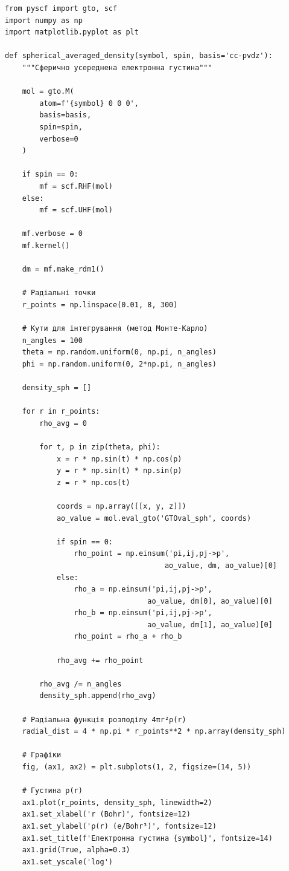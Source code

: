 \begin{verbatim}
from pyscf import gto, scf
import numpy as np
import matplotlib.pyplot as plt

def spherical_averaged_density(symbol, spin, basis='cc-pvdz'):
    """Сферично усереднена електронна густина"""

    mol = gto.M(
        atom=f'{symbol} 0 0 0',
        basis=basis,
        spin=spin,
        verbose=0
    )

    if spin == 0:
        mf = scf.RHF(mol)
    else:
        mf = scf.UHF(mol)

    mf.verbose = 0
    mf.kernel()

    dm = mf.make_rdm1()

    # Радіальні точки
    r_points = np.linspace(0.01, 8, 300)

    # Кути для інтегрування (метод Монте-Карло)
    n_angles = 100
    theta = np.random.uniform(0, np.pi, n_angles)
    phi = np.random.uniform(0, 2*np.pi, n_angles)

    density_sph = []

    for r in r_points:
        rho_avg = 0

        for t, p in zip(theta, phi):
            x = r * np.sin(t) * np.cos(p)
            y = r * np.sin(t) * np.sin(p)
            z = r * np.cos(t)

            coords = np.array([[x, y, z]])
            ao_value = mol.eval_gto('GTOval_sph', coords)

            if spin == 0:
                rho_point = np.einsum('pi,ij,pj->p',
                                     ao_value, dm, ao_value)[0]
            else:
                rho_a = np.einsum('pi,ij,pj->p',
                                 ao_value, dm[0], ao_value)[0]
                rho_b = np.einsum('pi,ij,pj->p',
                                 ao_value, dm[1], ao_value)[0]
                rho_point = rho_a + rho_b

            rho_avg += rho_point

        rho_avg /= n_angles
        density_sph.append(rho_avg)

    # Радіальна функція розподілу 4πr²ρ(r)
    radial_dist = 4 * np.pi * r_points**2 * np.array(density_sph)

    # Графіки
    fig, (ax1, ax2) = plt.subplots(1, 2, figsize=(14, 5))

    # Густина ρ(r)
    ax1.plot(r_points, density_sph, linewidth=2)
    ax1.set_xlabel('r (Bohr)', fontsize=12)
    ax1.set_ylabel('ρ(r) (e/Bohr³)', fontsize=12)
    ax1.set_title(f'Електронна густина {symbol}', fontsize=14)
    ax1.grid(True, alpha=0.3)
    ax1.set_yscale('log')


\end{verbatim}
